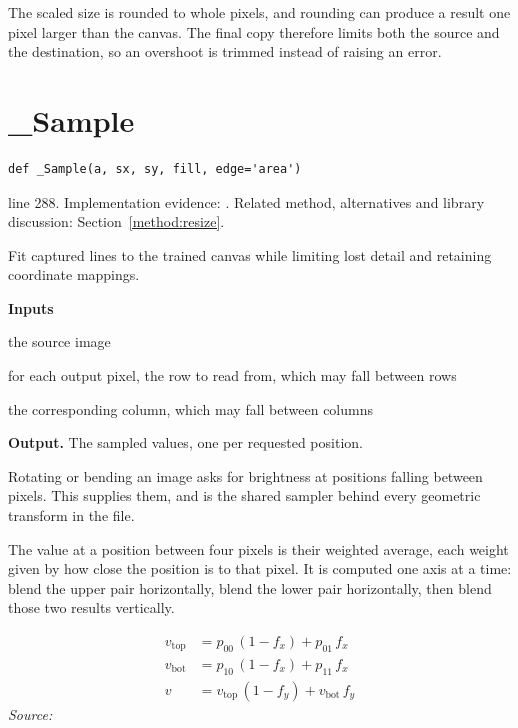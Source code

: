 The scaled size is rounded to whole pixels, and rounding can produce a result one pixel larger than the canvas. The final copy therefore limits both the source and the destination, so an overshoot is trimmed instead of raising an error.



\section{\_Sample}\label{fn:segment:-Sample}
\begin{lstlisting}[style=sig]
def _Sample(a, sx, sy, fill, edge='area')
\end{lstlisting}
 line 288. Implementation evidence: \cite{code2026}. Related method, alternatives and library discussion: Section~\ref{method:resize}.


Fit captured lines to the trained canvas while limiting lost detail and retaining coordinate mappings.




\noindent\textbf{Inputs}
\begin{description}[leftmargin=2.2em,style=nextline,font=\normalfont\ttfamily]\setlength\itemsep{1pt}
  \item[{img}] \normalfont the source image
  \item[{sy}] \normalfont for each output pixel, the row to read from, which may fall between rows
  \item[{sx}] \normalfont the corresponding column, which may fall between columns
\end{description}

\noindent\textbf{Output.} The sampled values, one per requested position.


Rotating or bending an image asks for brightness at positions falling between pixels. This supplies them, and is the shared sampler behind every geometric transform in the file.


The value at a position between four pixels is their weighted average, each weight given by how close the position is to that pixel. It is computed one axis at a time: blend the upper pair horizontally, blend the lower pair horizontally, then blend those two results vertically.


\begin{equation}
\begin{aligned}v_{\mathrm{top}} &= p_{00}\,(1-f_x) + p_{01}\, f_x \\[2pt]v_{\mathrm{bot}} &= p_{10}\,(1-f_x) + p_{11}\, f_x \\[2pt]v &= v_{\mathrm{top}}\,(1-f_y) + v_{\mathrm{bot}}\, f_y\end{aligned}
\end{equation}
\noindent\emph{Source: }\cite{wolberg1990}


